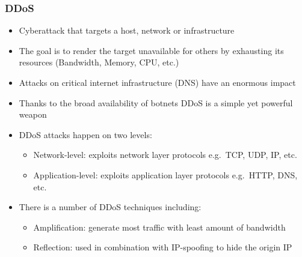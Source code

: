 \documentclass[10pt, presentation]{beamer}
\begin{document}
\begin{frame}
\frametitle{DDoS}
  \begin{itemize}
    \item Cyberattack that targets a host, network or infrastructure
    \item The goal is to render the target unavailable for others by exhausting its resources (Bandwidth, Memory, CPU, etc.)
    \item Attacks on critical internet infrastructure (DNS) have an enormous impact
    \item Thanks to the broad availability of botnets DDoS is a simple yet powerful weapon
    \item DDoS attacks happen on two levels:
  \begin{itemize}
      \item Network-level: exploits network layer protocols e.g.\ TCP, UDP, IP, etc.
      \item Application-level: exploits application layer protocols e.g.\ HTTP, DNS, etc.
  \end{itemize}
  \item There is a number of DDoS techniques including:
      \begin{itemize}
      \item Amplification: generate most traffic with least amount of bandwidth
      \item Reflection: used in combination with IP-spoofing to hide the origin IP
  \end{itemize}
  \end{itemize}
\end{frame}

\end{document}
